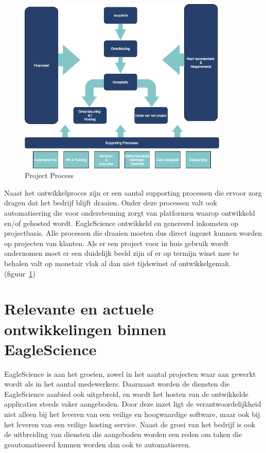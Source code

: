 \begin{figure}[bth]
\myfloatalign
\includegraphics[width=10cm]{gfx/ProcessFlow}
\caption{Project Process}
\label{fig:Project Process}
\end{figure}

Naast het ontwikkelproces zijn er een aantal supporting processen die ervoor zorg dragen dat het bedrijf blijft draaien. Onder deze processen valt ook automatisering die voor ondersteuning zorgt van platformen waarop ontwikkeld en/of gehosted wordt. EagleScience ontwikkeld en genereerd inkomsten op projectbasis. Alle processen die draaien moeten dus direct ingezet kunnen worden op projecten van klanten. Als er een project voor in huis gebruik wordt ondernomen moet er een duidelijk beeld zijn of er op termijn winst mee te behalen valt op monetair vlak al dan niet tijdswinst of ontwikkelgemak. (figuur~\ref{fig:Project Process})

\section{Relevante en actuele ontwikkelingen binnen EagleScience}\label{sec:relevante-en-actuele-ontwikkelingen-binnen-EagleScience}

EagleScience is aan het groeien, zowel in het aantal projecten waar aan gewerkt wordt als in het aantal medewerkers. Daarnaast worden de diensten die EagleScience aanbied ook uitgebreid, en wordt het hosten van de ontwikkelde applicaties steeds vaker aangeboden. Door deze inzet ligt de verantwoordelijkheid niet alleen bij het leveren van een veilige en hoogwaardige software, maar ook bij het leveren van een veilige hosting service. Naast de groei van het bedrijf is ook de uitbreiding van diensten die aangeboden worden een reden om taken die geautomatiseerd kunnen worden dan ook te automatiseren.

